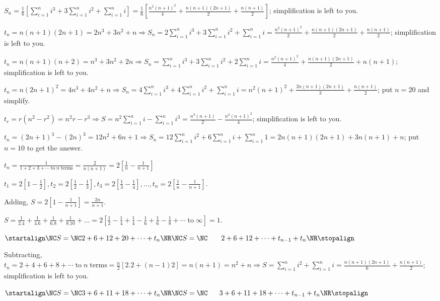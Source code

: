   $S_n = \frac{1}{6}\left[\sum_{i=1}^ni^3 + 3\sum_{i=1}^ni^2 + \sum_{i=1}^ni\right] =
  \frac{1}{6}\left[\frac{n^2(n + 1)^2}{4} + \frac{n(n + 1)(2n + 1)}{2} + \frac{n(n + 1)}{2}\right]$;
  simplification is left to you.
\item $t_n = n(n + 1)(2n + 1) = 2n^3 + 3n^2 + n \Rightarrow S_n = \displaystyle 2\sum_{i=1}^ni^3 +
  3\sum_{i=1}^ni^2 + \sum_{i=1}^ni = \frac{n^2(n + 1)^2}{2} + \frac{n(n + 1)(2n + 1)}{2} + \frac{n(n +
    1)}{2}$; simplification is left to you.
\item $t_n = n(n + 1)(n + 2) = n^3 + 3n^2 + 2n \Rightarrow \displaystyle S_n = \sum_{i=1}^ni^3 +
  3\sum_{i=1}^ni^2 + 2\sum_{i=1}^ni = \frac{n^2(n + 1)^2}{4} + \frac{n(n + 1)(2n + 1)}{2} + n(n + 1)$;
  simplification is left to you.
\item $t_n = n(2n + 1)^2 = 4n^3 + 4n^2 + n \Rightarrow \displaystyle S_n = 4\sum_{i=1}^ni^3 +
  4\sum_{i=1}^ni^2 + \sum_{i=1}^ni = n^2(n + 1)^2 + \frac{2n(n + 1)(2n + 1)}{3} + \frac{n(n + 1)}{2}$;
  put $n = 20$ and simplify.
\item $t_r = r(n^2 - r^2) = n^2r - r^3 \Rightarrow S = n^2\sum_{i=1}^ni - \sum_{i=1}^ni^3 = \frac{n^3(n +
  1)}{2} - \frac{n^2(n + 1)^2}{4}$; simplification is left to you.
\item $t_n = (2n + 1)^3 - (2n)^3 = 12n^2 + 6n + 1 \Rightarrow S_n = \displaystyle 12\sum_{i=1}^ni^2 +
  6\sum_{i=1}^ni + \sum_{i=1}^n1 = 2n(n + 1)(2n + 1) + 3n(n + 1) + n$; put $n = 10$ to get the answer.
\item $t_n = \frac{1}{1 + 2 + 3 + \cdots\;\mathrm{to}\;n\;\mathrm{terms}} = \frac{2}{n(n + 1)} =
  2\left[\frac{1}{n} - \frac{1}{n + 1}\right]$

  $t_1 = 2\left[1 - \frac{1}{2}\right], t_2 = 2\left[\frac{1}{2} - \frac{1}{3}\right], t_3 =
  2\left[\frac{1}{3} - \frac{1}{4}\right], \ldots, t_n = 2\left[\frac{1}{n} - \frac{1}{n  + 1}\right]$.

  Adding, $S = 2\left[1 - \frac{1}{n + 1}\right] = \frac{2n}{n + 1}$.
\item $S = \frac{1}{2.4} + \frac{1}{4.6} + \frac{1}{6.8} + \frac{1}{8.10} + \ldots = 2\left[\frac{1}{2} -
  \frac{1}{4} + \frac{1}{4} - \frac{1}{6} + \frac{1}{6} - \frac{1}{8} + \cdots\;\mathrm{to}\;\infty\right] =
  1$.
\item $\startalign\NC S = \NC2 + 6 + 12 + 20 + \cdots + t_n\NR\NC S = \NC\;\;\;\;\;\;\; 2 + 6 + 12 + \cdots +
  t_{n - 1} + t_n\NR\stopalign$

  Subtracting, $t_n = 2 + 4 + 6 + 8 + \cdots\;\mathrm{to}\;n\;\mathrm{terms} = \frac{n}{2}[2.2 + (n - 1)2] =
  n(n + 1) = n^2 + n \Rightarrow S = \displaystyle \sum_{i=1}^ni^2 + \sum_{i=1}^ni = \frac{n(n + 1)(2n +
    1)}{6} + \frac{n(n + 1)}{2}$; simplification is left to you.
\item $\startalign\NC S = \NC 3 + 6 + 11 + 18 + \cdots + t_n\NR\NC S = \NC\;\;\;\;\;\;3 + 6 + 11 + 18 +
  \cdots + t_{n - 1} + t_n\NR\stopalign$

